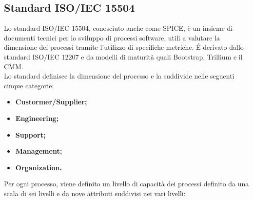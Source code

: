 	\subsection{Standard ISO/IEC 15504}
	Lo standard ISO/IEC 15504, conosciuto anche come SPICE, è un insieme di documenti tecnici per lo sviluppo di processi software, utili a valutare la dimensione dei processi tramite l'utilizzo di specifiche metriche. É derivato dallo standard ISO/IEC 12207 e da modelli di maturità quali Bootstrap, Trillium e il CMM.\\
	Lo standard definisce la dimensione del processo e la suddivide nelle seguenti cinque categorie:
		\begin{itemize}
			\item \textbf{Custormer/Supplier;}
			\item \textbf{Engineering;}
			\item \textbf{Support;}
			\item \textbf{Management;}
			\item \textbf{Organization.}
		\end{itemize}
	Per ogni processo, viene definito un livello di capacità dei processi definito da una scala di sei livelli e da nove attributi suddivisi nei vari livelli:
